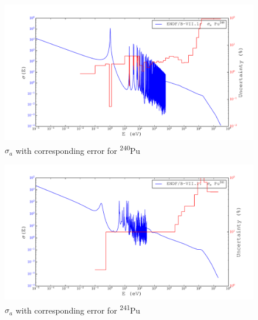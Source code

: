 \documentclass[11pt,notitlepage]{article}
\newcommand{\tss}{\textsuperscript}
\begin{document}
\begin{todolist}
    \begin{figure}[H]
    \begin{center}
      \includegraphics[width=0.9\columnwidth]{../Weighting/X_Sections/XwVar_Pu_240_94_a.pdf}
      \vspace{-5mm}
      \caption{$\sigma_a$ with corresponding error for \tss{240}Pu}
      \label{fig:XPu240}
    \end{center}
  \end{figure}

    \begin{figure}[H]
    \begin{center}
      \includegraphics[width=0.9\columnwidth]{../Weighting/X_Sections/XwVar_Pu_241_94_a.pdf}
      \vspace{-5mm}
      \caption{$\sigma_a$ with corresponding error for \tss{241}Pu}
      \label{fig:XPu241}
    \end{center}
  \end{figure}


\end{todolist}
\end{document}
